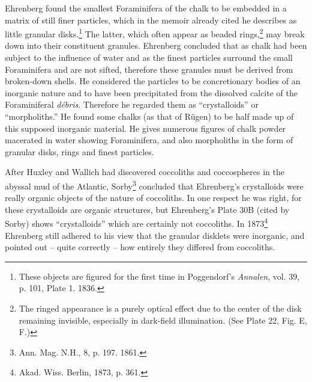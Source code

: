 \documentclass[a4paper, 12pt, oneside]{article}
\begin{document}
Ehrenberg found the smallest Foraminifera of the chalk to be embedded in a matrix of still finer particles, which in the memoir already cited he describes as little granular disks.\footnote{These objects are figured for the first time in Poggendorf's \emph{Annalen}, vol. 39, p. 101, Plate 1. 1836.} The latter, which often appear as beaded rings,\footnote{The ringed appearance is a purely optical effect due to the center of the disk remaining invisible, especially in dark-field illumination. (See Plate 22, Fig. E, F.)} may break down into their constituent granules. Ehrenberg concluded that as chalk had been subject to the influence of water and as the finest particles surround the small Foraminifera and are not sifted, therefore these granules must be derived from broken-down shells. He considered the particles to be concretionary bodies of an inorganic nature and to have been precipitated from the dissolved calcite of the Foraminiferal \emph{débris}. Therefore he regarded them as ``crystalloids'' or ``morpholiths.'' He found some chalks (as that of Rügen) to be half made up of this supposed inorganic material. He gives numerous figures of chalk powder macerated in water showing Foraminifera, and also morpholiths in the form of granular disks, rings and finest particles.

After Huxley and Wallich had discovered coccoliths and coccospheres in the abyssal mud of the Atlantic, Sorby\footnote{Ann. Mag. N.H., 8, p. 197. 1861.} concluded that Ehrenberg's crystalloids were really organic objects of the nature of coccoliths. In one respect he was right, for these crystalloids are organic structures, but Ehrenberg's Plate 30B (cited by Sorby) shows ``crystalloids'' which are certainly not coccoliths. In 1873\footnote{Akad. Wiss. Berlin, 1873, p. 361.} Ehrenberg still adhered to his view that the granular disklets were inorganic, and pointed out -- quite correctly -- how entirely they differed from coccoliths.
\end{document}
